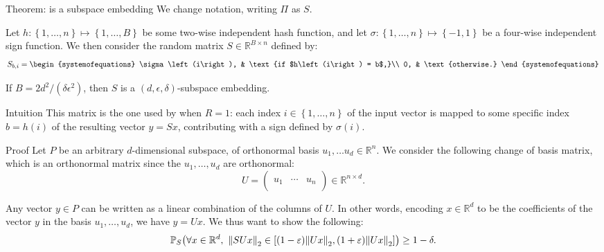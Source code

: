 \documentclass[a4paper]{article}
\begin{document}
\begin{parag}{Theorem:  is a subspace embedding}
    We change notation, writing $\Pi$ as $S$.

    Let $h: \left\{1, \ldots, n\right\} \mapsto \left\{1, \ldots, B\right\}$ be some two-wise independent hash function, and let $\sigma: \left\{1, \ldots, n\right\} \mapsto \left\{-1, 1\right\}$ be a four-wise independent sign function. We then consider the random matrix $S \in \mathbb{R}^{B \times n}$ defined by:
    \[S_{b, i} = \begin{systemofequations} \sigma\left(i\right), & \text{if $h\left(i\right) = b$,}\\ 0, & \text{otherwise.} \end{systemofequations}\]
   
    If $B = 2d^2/\left(\delta \epsilon^2\right)$, then $S$ is a $\left(d, \epsilon, \delta\right)$-subspace embedding.

    \begin{subparag}{Intuition}
        This matrix is the one used by  when $R = 1$: each index $i \in \left\{1, \ldots ,n\right\}$ of the input vector is mapped to some specific index $b = h\left(i\right)$ of the resulting vector $y = S x$, contributing with a sign defined by $\sigma\left(i\right)$. 
    \end{subparag}
    
    \begin{subparag}{Proof}
        Let $P$ be an arbitrary $d$-dimensional subspace, of orthonormal basis $u_1, \ldots u_d \in \mathbb{R}^n$. We consider the following change of basis matrix, which is an orthonormal matrix since the $u_1, \ldots, u_d$ are orthonormal:
        \[U = \begin{pmatrix}  &  &  \\ u_1 & \cdots & u_n \\  &  &  \end{pmatrix} \in \mathbb{R}^{n \times d}.\]
        
        Any vector $y \in P$ can be written as a linear combination of the columns of $U$. In other words, encoding $x \in \mathbb{R}^d$ to be the coefficients of the vector $y$ in the basis $u_1, \ldots, u_d$, we have $y = U x$. We thus want to show the following: 
        \[\prob_S\left(\forall x \in \mathbb{R}^d,\ \left\|S U x\right\|_2 \in \left[\left(1 - \epsilon\right) \left\|U x\right\|_2, \left(1 + \epsilon\right) \left\|U x\right\|_2\right]\right) \geq 1 - \delta.\]
        

\end{subparag}
\end{parag}
\end{document}
